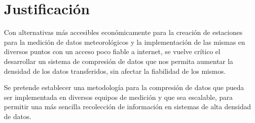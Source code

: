 \section{Justificación}

Con alternativas más accesibles económicamente para la creación de estaciones para la medición de datos meteorológicos \cite{hernandezimplementacion} y la implementación de las mismas en diversos puntos con un acceso poco fiable a internet, se vuelve crítico el desarrollar un sistema de compresión de datos que nos permita aumentar la densidad de los datos transferidos, sin afectar la fiabilidad de los mismos.

Se pretende establecer una metodología para la compresión de datos que pueda ser implementada en diversos equipos de medición y que sea escalable, para permitir una más sencilla recolección de información en sistemas de alta densidad de datos.
